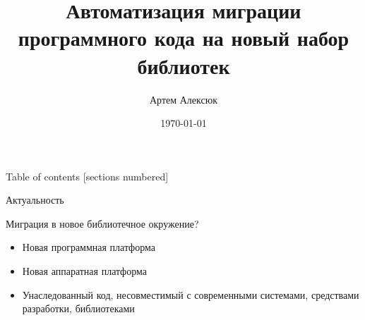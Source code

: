 \documentclass[12pt]{beamer}
\title{Автоматизация миграции программного кода на новый набор библиотек}
\date{\today}
\author{Артем Алексюк}
\institute{Санкт-Петербургский политехнический университет Петра Великого}
\begin{document}
\maketitle

\begin{frame}{Table of contents}
  [sections numbered]
  \tableofcontents[hideallsubsections]
\end{frame}



{
\begin{frame}{Актуальность}
\begin{mybox}[]
Миграция в новое библиотечное окружение?
\begin{itemize}
	\item Новая программная платформа
	\item Новая аппаратная платформа
	\item Унаследованный код, несовместимый с современными системами, средствами разработки, библиотеками
\end{itemize}
\end{mybox}
\end{frame}
}
\end{document}
